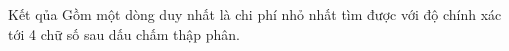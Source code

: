 Kết qủa  
Gồm một dòng duy nhất là chi phí nhỏ nhất tìm được với độ chính xác tới 4 chữ số sau dấu chấm thập phân.